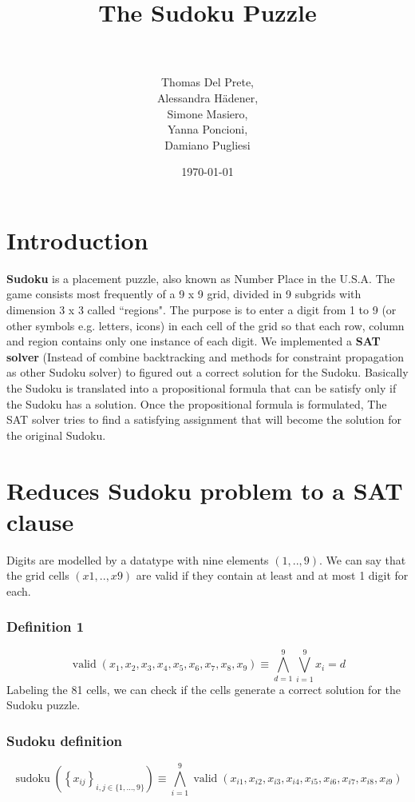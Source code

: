 \documentclass[paper=a4, fontsize=14pt]{scrartcl} %
\title{	
\huge The Sudoku Puzzle \\ %
\horrule{0.5pt} \\[0.5cm] %
}
\author{Thomas Del Prete, \\
		Alessandra H{\" a}dener, \\
		Simone Masiero, \\
		Yanna Poncioni, \\
		Damiano Pugliesi} %
\date{\normalsize\today} %
\begin{document}
	
	\maketitle
	
	\section*{Introduction}
	
		\textbf{Sudoku} is a placement puzzle, also known as Number Place in the U.S.A.
		\newline
		The game consists most frequently of a 9 x 9 grid, divided in 9 subgrids with dimension 3 x 3 called ``regions".
		\newline
		The purpose is to enter a digit from 1 to 9 (or other symbols e.g. letters, icons) in each cell of the grid so that each row, column and region contains only one instance of each digit.
		\newline
		We implemented a \textbf{SAT solver} (Instead of combine backtracking and methods for constraint propagation as other Sudoku solver) to figured out a correct solution for the Sudoku.
		\newline
		Basically the Sudoku is translated into a propositional formula that can be satisfy only if the Sudoku has a solution.
		\newline
		Once the propositional formula is formulated, The SAT solver tries to find a satisfying assignment that will become the solution for the original Sudoku.
			 			
	\section*{Reduces Sudoku problem to a SAT clause}
	
	
	Digits are modelled by a datatype with nine elements $(1, . . , 9)$.
	\newline
	We can say that the grid cells $(x1, . . , x9)$ are valid if they contain
	at least and at most 1 digit for each.
	\subsubsection*{Definition 1}
		\[ \operatorname{valid}\left(x_{1}, x_{2}, x_{3}, x_{4}, x_{5}, x_{6}, x_{7}, x_{8}, x_{9}\right) \equiv \bigwedge_{d=1}^{9} \bigvee_{i=1}^{9} x_{i}=d \]
	Labeling the 81 cells, we can check if the cells generate a correct solution for the Sudoku puzzle.
	
	\subsubsection*{Sudoku definition}
	\[\operatorname{sudoku}\left(\left\{x_{i j}\right\}_{i, j \in\{1, \ldots, 9\}}\right) \equiv \bigwedge_{i=1}^{9} \operatorname{valid}\left(x_{i 1}, x_{i 2}, x_{i 3}, x_{i 4}, x_{i 5}, x_{i 6}, x_{i 7}, x_{i 8}, x_{i 9}\right)\]
	
\end{document}
